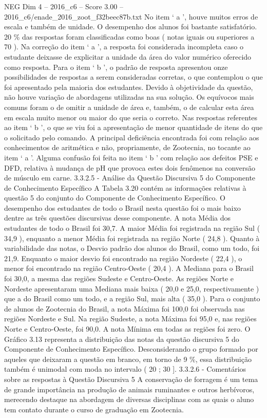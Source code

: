 \begin{textsample}{NEG Dim 4 – 2016\_c6 – Score 3.00 – 2016\_c6/enade\_2016\_zoot\_f32beec87b.txt}
No item ‘ a ’, houve muitos erros de escala e também de unidade.
O desempenho dos alunos foi bastante satisfatório. 20 \% das respostas foram classificadas como boas ( notas iguais ou superiores a 70 ).
Na correção do item ‘ a ’, a resposta foi considerada incompleta caso o estudante deixasse de explicitar a unidade da área do valor numérico oferecido como resposta.
Para o item ‘ b ’, o padrão de resposta apresentou onze possibilidades de respostas a serem consideradas corretas, o que contemplou o que foi apresentado pela maioria dos estudantes.
Devido à objetividade da questão, não houve variação de abordagens utilizadas na sua solução.
Os equívocos mais comuns foram o de omitir a unidade de área e, também, o de calcular esta área em escala muito menor ou maior do que seria o correto.
Nas respostas referentes ao item ‘ b ’, o que se viu foi a apresentação de menor quantidade de itens do que o solicitado pelo comando.
A principal deficiência encontrada foi com relação aos conhecimentos de aritmética e não, propriamente, de Zootecnia, no tocante ao item ‘ a ’.
Alguma confusão foi feita no item ‘ b ’ com relação aos defeitos PSE e DFD, relativa à mudança de pH que provoca estes dois fenômenos na conversão de músculo em carne. 3.3.2.5 - Análise da Questão Discursiva 5 do Componente de Conhecimento Específico A Tabela 3.20 contém as informações relativas à questão 5 do conjunto do Componente de Conhecimento Específico.
O desempenho dos estudantes de todo o Brasil nesta questão foi o mais baixo dentre as três questões discursivas desse componente.
A nota Média dos estudantes de todo o Brasil foi 30,7.
A maior Média foi registrada na região Sul ( 34,9 ), enquanto a menor Média foi registrada na região Norte ( 24,8 ).
Quanto à variabilidade das notas, o Desvio padrão dos alunos do Brasil, como um todo, foi 21,9.
Enquanto o maior desvio foi encontrado na região Nordeste ( 22,4 ), o menor foi encontrado na região Centro-Oeste ( 20,4 ).
A Mediana para o Brasil foi 30,0, a mesma das regiões Sudeste e Centro-Oeste.
As regiões Norte e Nordeste apresentaram uma Mediana mais baixa ( 20,0 e 25,0, respectivamente ) que a do Brasil como um todo, e a região Sul, mais alta ( 35,0 ).
Para o conjunto de alunos de Zootecnia do Brasil, a nota Máxima foi 100,0 foi observada nas regiões Nordeste e Sul.
Na região Sudeste, a nota Máxima foi 95,0 e, nas regiões Norte e Centro-Oeste, foi 90,0.
A nota Mínima em todas as regiões foi zero.
O Gráfico 3.13 representa a distribuição das notas da questão discursiva 5 do Componente de Conhecimento Específico.
Desconsiderando o grupo formado por aqueles que deixaram a questão em branco, em torno de 9 \%, essa distribuição também é unimodal com moda no intervalo ( 20 ; 30 ]. 3.3.2.6 - Comentários sobre as respostas à Questão Discursiva 5 A conservação de forragem é um tema de grande importância na produção de animais ruminantes e outros herbívoros, merecendo destaque na abordagem de diversas disciplinas com as quais o aluno tem contato durante o curso de graduação em Zootecnia.

\end{textsample}
